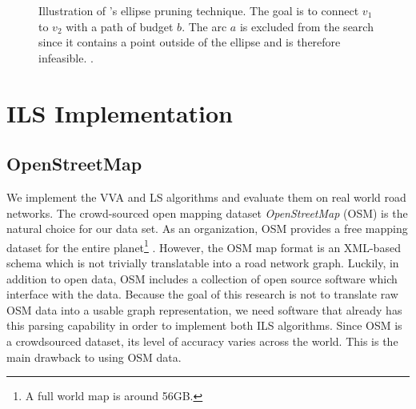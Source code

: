 \documentclass[honors]{union-cs-thesis}
\begin{document}
\begin{figure}
\begin{center}
\end{center}
\caption{Illustration of \citeauthor{lu2015arc}'s ellipse pruning technique. The goal is to connect $v_1$ to $v_2$ with a path of budget $b$. The arc $a$ is excluded from the search since it contains a point outside of the ellipse and is therefore infeasible. \cite{lu2015arc}.}
\label{fig:ellipse}
\end{figure}



\section{ILS Implementation}

\subsection{OpenStreetMap}
We implement the VVA and LS algorithms and evaluate them on real world road networks. The crowd-sourced open mapping dataset \emph{OpenStreetMap} (OSM) is the natural choice for our data set. As an organization, OSM  provides a free mapping dataset for the entire planet\footnote{A full world map is around 56GB.} \cite{osm}. However, the OSM map format is an XML-based schema which is not trivially translatable into a road network graph. Luckily, in addition to open data, OSM includes a collection of open source software which interface with the data. Because the goal of this research is not to translate raw OSM data into a usable graph representation, we need software that already has this parsing capability in order to implement both ILS algorithms. Since OSM is a crowdsourced dataset, its level of accuracy varies across the world. This is the main drawback to using OSM data. 
\end{document}
